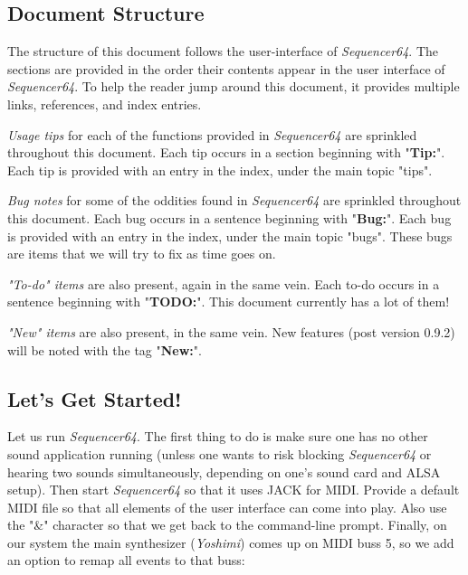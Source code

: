 \documentclass[
 11pt,
 twoside,
 a4paper,
 headinclude,
 footinclude,
 final                                 %
]{article}
\begin{document}
\subsection{Document Structure}
\label{subsec:introduction_document_structure}

   The structure of this document follows the user-interface of
   \textsl{Sequencer64}.  The sections are provided in the order
   their contents appear in the user interface of \textsl{Sequencer64}.  To
   help the reader jump around this document, it provides
   multiple links, references, and index entries.

   \textsl{Usage tips}
   for each of the functions provided in
   \textsl{Sequencer64} are sprinkled throughout this document.
   Each tip occurs in a section beginning with "\textbf{Tip:}".
   Each tip is provided with an entry in the index, under the
   main topic "tips".

   \textsl{Bug notes}
   for some of the oddities found in \textsl{Sequencer64} are
   sprinkled throughout this document.
   Each bug occurs in a sentence beginning with "\textbf{Bug:}".
   Each bug is provided with an entry in the index, under the
   main topic "bugs".  These bugs are items that we will try to
   fix as time goes on.

   \textsl{"To-do" items}
   are also present, again in the same vein.
   Each to-do occurs in a sentence beginning with "\textbf{TODO:}".
   This document currently has a lot of them!

   \textsl{"New" items}
   are also present, in the same vein.
   New features (post version 0.9.2) will be noted with the tag
   "\textbf{New:}".

\subsection{Let's Get Started!}
\label{subsec:introduction_lets_get_started}

   Let us run \textsl{Sequencer64}.
   The first
   thing to do is make sure one has no other sound application running
   (unless one wants to risk blocking \textsl{Sequencer64} or hearing two
   sounds simultaneously, depending on one's sound card and ALSA setup).
   Then start \textsl{Sequencer64} so that it uses JACK for MIDI.  Provide a
   default MIDI file so that all elements of the user interface can come
   into play.  Also use the "\&" character so that we get back to the
   command-line prompt.  Finally, on our system the main synthesizer
   (\textsl{Yoshimi}) comes up on MIDI buss 5, so we add an option to remap
   all events to that buss:
\end{document}
